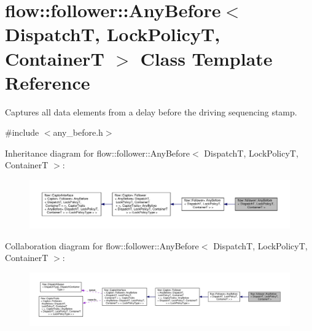 \hypertarget{classflow_1_1follower_1_1_any_before}{}\section{flow\+:\+:follower\+:\+:Any\+Before$<$ DispatchT, Lock\+PolicyT, ContainerT $>$ Class Template Reference}
\label{classflow_1_1follower_1_1_any_before}


Captures all data elements from a delay before the driving sequencing stamp.  




{\ttfamily \#include $<$any\+\_\+before.\+h$>$}



Inheritance diagram for flow\+:\+:follower\+:\+:Any\+Before$<$ DispatchT, Lock\+PolicyT, ContainerT $>$\+:\nopagebreak
\begin{figure}[H]
\begin{center}
\leavevmode
\includegraphics[width=350pt]{classflow_1_1follower_1_1_any_before__inherit__graph}
\end{center}
\end{figure}


Collaboration diagram for flow\+:\+:follower\+:\+:Any\+Before$<$ DispatchT, Lock\+PolicyT, ContainerT $>$\+:\nopagebreak
\begin{figure}[H]
\begin{center}
\leavevmode
\includegraphics[width=350pt]{classflow_1_1follower_1_1_any_before__coll__graph}
\end{center}
\end{figure}
